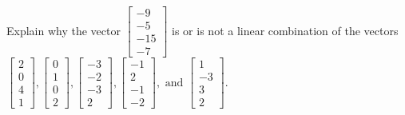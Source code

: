 \documentclass{article}
\begin{document}
\begin{exerciseStatement}
    Explain why the vector \(\left[\begin{array}{c}
-9 \\
-5 \\
-15 \\
-7
\end{array}\right]\)  is or is not a linear
combination of the vectors \(\left[\begin{array}{c}
2 \\
0 \\
4 \\
1
\end{array}\right] , \left[\begin{array}{c}
0 \\
1 \\
0 \\
2
\end{array}\right] , \left[\begin{array}{c}
-3 \\
-2 \\
-3 \\
2
\end{array}\right] , \left[\begin{array}{c}
-1 \\
2 \\
-1 \\
-2
\end{array}\right] , \text{ and } \left[\begin{array}{c}
1 \\
-3 \\
3 \\
2
\end{array}\right]\).



  
\end{exerciseStatement}
\end{document}
